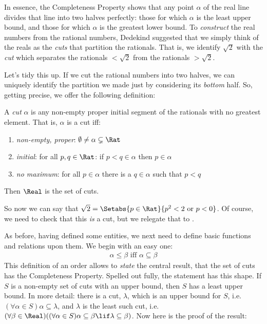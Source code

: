\documentclass[../../../include/open-logic-section]{subfiles}
\begin{document}

In essence, the Completeness Property shows that any point $\alpha$ of
the real line divides that line into two halves perfectly: those for
which $\alpha$ is the least upper bound, and those for which $\alpha$
is the greatest lower bound. To \emph{construct} the real numbers from
the rational numbers, Dedekind suggested that we simply think of the
reals as the \emph{cuts} that partition the rationals. That is, we
identify $\sqrt{2}$ with the \emph{cut} which separates the rationals
$< \sqrt{2}$ from the rationals $> \sqrt{2}$. 

Let's tidy this up. If we cut the rational numbers into two halves, we
can uniquely identify the partition we made just by considering its
\emph{bottom} half. So, getting precise, we offer the following
definition:

\begin{defn}[Cut] 
A \emph{cut} $\alpha$ is any non-empty proper
initial segment of the rationals with no greatest element. That is,
$\alpha$ is a cut iff:
\begin{enumerate}
	\item \emph{non-empty, proper}: $\emptyset \neq \alpha \subsetneq \Rat$
	\item \emph{initial}: for all $p,q \in \Rat$: if $p < q \in \alpha$ then $p \in \alpha$
	\item \emph{no maximum}: for all $p \in \alpha$ there is a $q \in \alpha$ such that $p < q$ 
\end{enumerate} 
Then $\Real$ is the set of cuts. 
\end{defn}

So now we can say that $\sqrt{2} = \Setabs{p \in \Rat}{p^2 < 2\text{
or }p < 0}$. Of course, we need to check that this \emph{is} a cut,
but we relegate that to .

As before, having defined some entities, we next need to define basic
functions and relations upon them. We begin with an easy one:
\begin{align*}
	\alpha \leq \beta \text{ iff }\alpha \subseteq \beta
\end{align*}
This definition of an order allows to \emph{state} the central result,
that the set of cuts has the Completeness Property. Spelled out fully,
the statement has this shape. If $S$ is a non-empty set of cuts with
an upper bound, then $S$ has a least upper bound. In more detail: there is a cut, $\lambda$, which is an upper bound for $S$, i.e.\ $(\forall \alpha \in S)\alpha \subseteq
\lambda$, and $\lambda$ is the least such cut, i.e.\ $(\forall \beta \in \Real)((\forall \alpha \in S)\alpha \subseteq \beta \lif \lambda \subseteq \beta)$. Now here is
the proof of the result:
\end{document}
